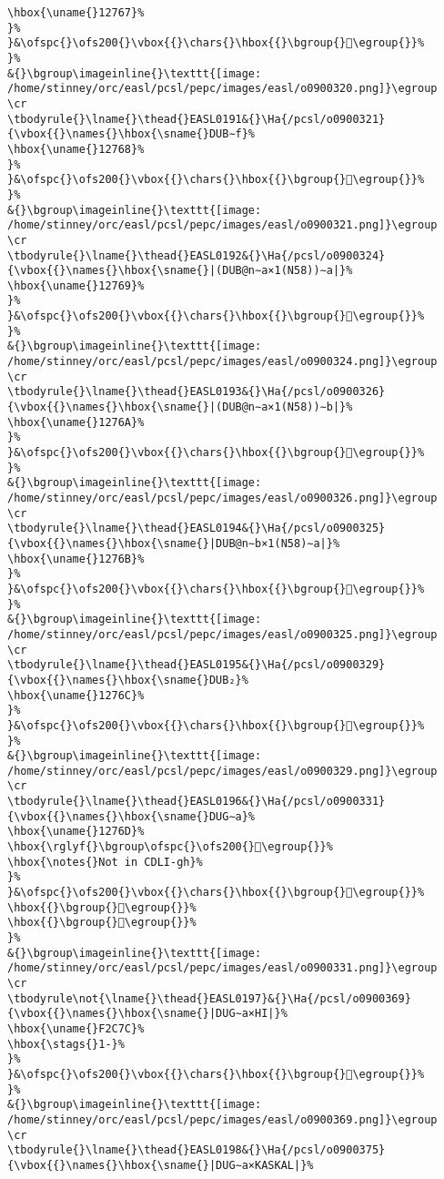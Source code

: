 \begin{verbatim}
\hbox{\uname{}12767}%
}%
}&\ofspc{}\ofs200{}\vbox{{}\chars{}\hbox{{}\bgroup{}𒝧\egroup{}}%
}%
&{}\bgroup\imageinline{}\texttt{[image: /home/stinney/orc/easl/pcsl/pepc/images/easl/o0900320.png]}\egroup
\cr
\tbodyrule{}\lname{}\thead{}EASL0191&{}\Ha{/pcsl/o0900321}{\vbox{{}\names{}\hbox{\sname{}DUB∼f}%
\hbox{\uname{}12768}%
}%
}&\ofspc{}\ofs200{}\vbox{{}\chars{}\hbox{{}\bgroup{}𒝨\egroup{}}%
}%
&{}\bgroup\imageinline{}\texttt{[image: /home/stinney/orc/easl/pcsl/pepc/images/easl/o0900321.png]}\egroup
\cr
\tbodyrule{}\lname{}\thead{}EASL0192&{}\Ha{/pcsl/o0900324}{\vbox{{}\names{}\hbox{\sname{}|(DUB@n∼a×1(N58))∼a|}%
\hbox{\uname{}12769}%
}%
}&\ofspc{}\ofs200{}\vbox{{}\chars{}\hbox{{}\bgroup{}𒝩\egroup{}}%
}%
&{}\bgroup\imageinline{}\texttt{[image: /home/stinney/orc/easl/pcsl/pepc/images/easl/o0900324.png]}\egroup
\cr
\tbodyrule{}\lname{}\thead{}EASL0193&{}\Ha{/pcsl/o0900326}{\vbox{{}\names{}\hbox{\sname{}|(DUB@n∼a×1(N58))∼b|}%
\hbox{\uname{}1276A}%
}%
}&\ofspc{}\ofs200{}\vbox{{}\chars{}\hbox{{}\bgroup{}𒝪\egroup{}}%
}%
&{}\bgroup\imageinline{}\texttt{[image: /home/stinney/orc/easl/pcsl/pepc/images/easl/o0900326.png]}\egroup
\cr
\tbodyrule{}\lname{}\thead{}EASL0194&{}\Ha{/pcsl/o0900325}{\vbox{{}\names{}\hbox{\sname{}|DUB@n∼b×1(N58)∼a|}%
\hbox{\uname{}1276B}%
}%
}&\ofspc{}\ofs200{}\vbox{{}\chars{}\hbox{{}\bgroup{}𒝫\egroup{}}%
}%
&{}\bgroup\imageinline{}\texttt{[image: /home/stinney/orc/easl/pcsl/pepc/images/easl/o0900325.png]}\egroup
\cr
\tbodyrule{}\lname{}\thead{}EASL0195&{}\Ha{/pcsl/o0900329}{\vbox{{}\names{}\hbox{\sname{}DUB₂}%
\hbox{\uname{}1276C}%
}%
}&\ofspc{}\ofs200{}\vbox{{}\chars{}\hbox{{}\bgroup{}𒝬\egroup{}}%
}%
&{}\bgroup\imageinline{}\texttt{[image: /home/stinney/orc/easl/pcsl/pepc/images/easl/o0900329.png]}\egroup
\cr
\tbodyrule{}\lname{}\thead{}EASL0196&{}\Ha{/pcsl/o0900331}{\vbox{{}\names{}\hbox{\sname{}DUG∼a}%
\hbox{\uname{}1276D}%
\hbox{\rglyf{}\bgroup\ofspc{}\ofs200{}𒝭\egroup{}}%
\hbox{\notes{}Not in CDLI-gh}%
}%
}&\ofspc{}\ofs200{}\vbox{{}\chars{}\hbox{{}\bgroup{}𒝶\egroup{}}%
\hbox{{}\bgroup{}𒝵\egroup{}}%
\hbox{{}\bgroup{}𒝭\egroup{}}%
}%
&{}\bgroup\imageinline{}\texttt{[image: /home/stinney/orc/easl/pcsl/pepc/images/easl/o0900331.png]}\egroup
\cr
\tbodyrule\not{\lname{}\thead{}EASL0197}&{}\Ha{/pcsl/o0900369}{\vbox{{}\names{}\hbox{\sname{}|DUG∼a×HI|}%
\hbox{\uname{}F2C7C}%
\hbox{\stags{}1-}%
}%
}&\ofspc{}\ofs200{}\vbox{{}\chars{}\hbox{{}\bgroup{}󲱼\egroup{}}%
}%
&{}\bgroup\imageinline{}\texttt{[image: /home/stinney/orc/easl/pcsl/pepc/images/easl/o0900369.png]}\egroup
\cr
\tbodyrule{}\lname{}\thead{}EASL0198&{}\Ha{/pcsl/o0900375}{\vbox{{}\names{}\hbox{\sname{}|DUG∼a×KASKAL|}%

\end{verbatim}
